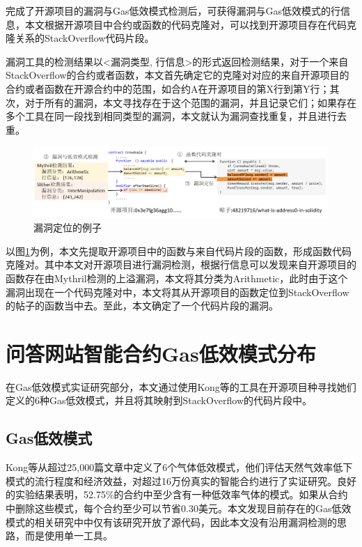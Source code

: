 完成了开源项目的漏洞与Gas低效模式检测后，可获得漏洞与Gas低效模式的行信息，本文根据开源项目中合约或函数的代码克隆对，可以找到开源项目存在代码克隆关系的StackOverflow代码片段。

漏洞工具的检测结果以<漏洞类型, 行信息>的形式返回检测结果，对于一个来自StackOverflow的合约或者函数，本文首先确定它的克隆对对应的来自开源项目的合约或者函数在开源合约中的范围，如合约A在开源项目的第X行到第Y行；其次，对于所有的漏洞，本文寻找存在于这个范围的漏洞，并且记录它们；如果存在多个工具在同一段找到相同类型的漏洞，本文就认为漏洞查找重复，并且进行去重。

\begin{figure}[htbp]
\centering
\includegraphics[width=1\textwidth]{figures/locate-example.png}
\caption{漏洞定位的例子}
\label{locate-exa}
\end{figure}

以图\ref{locate-exa}为例，本文先提取开源项目中的函数与来自代码片段的函数，形成函数代码克隆对。其中本文对开源项目进行漏洞检测，根据行信息可以发现来自开源项目的函数存在由Mythril检测的上溢漏洞，本文将其分类为Arithmetic，此时由于这个漏洞出现在一个代码克隆对中，本文将其从开源项目的函数定位到StackOverflow的帖子的函数当中去。至此，本文确定了一个代码片段的漏洞。

\section{\label{gasAnalysis}问答网站智能合约Gas低效模式分布}

在Gas低效模式实证研究部分，本文通过使用Kong等\cite{gasPattern}的工具在开源项目种寻找她们定义的6种Gas低效模式，并且将其映射到StackOverflow的代码片段中。

\subsection{Gas低效模式}

Kong等\cite{gasPattern}从超过25,000篇文章中定义了6个气体低效模式，他们评估天然气效率低下模式的流行程度和经济效益，对超过16万份真实的智能合约进行了实证研究。良好的实验结果表明，52.75\%的合约中至少含有一种低效率气体的模式。如果从合约中删除这些模式，每个合约至少可以节省0.30美元。本文发现目前存在的Gas低效模式的相关研究中\cite{GasChecker}\cite{gasPattern}中仅有该研究开放了源代码，因此本文没有沿用漏洞检测的思路，而是使用单一工具。


